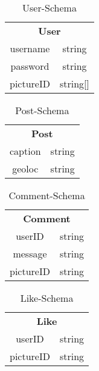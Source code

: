 \begin{table}[!htb]
    \begin{tabularx}{\textwidth}{|c|c|}
        \cline{1-2}
        \multicolumn{2}{c}{\textbf{User}}\\
        \cline{1-2}
        username & string\\
        \cline{1-2}
        password & string\\
        \cline{1-2}
        pictureID & string[]\\
        \cline{1-2}
    \end{tabularx}
\caption{User-Schema}
\label{userschema}
\end{table}



\begin{table}[!htb]
\begin{tabularx}{\textwidth}{|c|c|}
    \cline{1-2}
    \multicolumn{2}{c}{\textbf{Post}}\\
    \cline{1-2}
    caption & string\\
    \cline{1-2}
    geoloc & string\\
    \cline{1-2}
\end{tabularx}
\caption{Post-Schema}
\label{postschema}
\end{table}

\begin{table}[!htb]
\begin{tabularx}{\textwidth}{|c|c|}
    \cline{1-2}
    \multicolumn{2}{c}{\textbf{Comment}}\\
    \cline{1-2}
    userID & string\\
    \cline{1-2}
    message & string\\
    \cline{1-2}
    pictureID & string\\
    \cline{1-2}
\end{tabularx}
\caption{Comment-Schema}
\label{commentschema}
\end{table}

\begin{table}[!htb]
\begin{tabularx}{\textwidth}{|c|c|}
    \cline{1-2}
    \multicolumn{2}{c}{\textbf{Like}}\\
    \cline{1-2}
    userID & string\\
    \cline{1-2}
    pictureID & string\\
    \cline{1-2}
\end{tabularx}
\caption{Like-Schema}
\label{likeschema}
\end{table}


